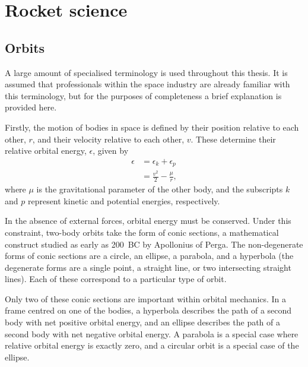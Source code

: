 \chapter{Rocket science} \label{cha:Rocket-science}

\section{Orbits} \label{sec:Orbits}

A large amount of specialised terminology is used throughout this thesis. It is assumed that professionals within the space industry are already familiar with this terminology, but for the purposes of completeness a brief explanation is provided here. 

Firstly, the motion of bodies in space is defined by their position relative to each other, $r$, and their velocity relative to each other, $v$. These determine their relative orbital energy, $\epsilon$, given by %
\begin{subequations} \label{eq:Specific-orbital-energy}
\begin{align} 
\epsilon &= \epsilon_k + \epsilon_p \\
&= \frac{v^2}{2} - \frac{\mu}{r},
\end{align}
\end{subequations}
where $\mu$ is the gravitational parameter of the other body, and the subscripts $k$ and $p$ represent kinetic and potential energies, respectively.

In the absence of external forces, orbital energy must be conserved. Under this constraint, two-body orbits take the form of conic sections, a mathematical construct studied as early as 200~BC by Apollonius of Perga. The non-degenerate forms of conic sections are a circle, an ellipse, a parabola, and a hyperbola (the degenerate forms are a single point, a straight line, or two intersecting straight lines). Each of these correspond to a particular type of orbit. 

Only two of these conic sections are important within orbital mechanics. In a frame centred on one of the bodies, a hyperbola describes the path of a second body with net positive orbital energy, and an ellipse describes the path of a second body with net negative orbital energy. A parabola is a special case where relative orbital energy is exactly zero, and a circular orbit is a special case of the ellipse. 

